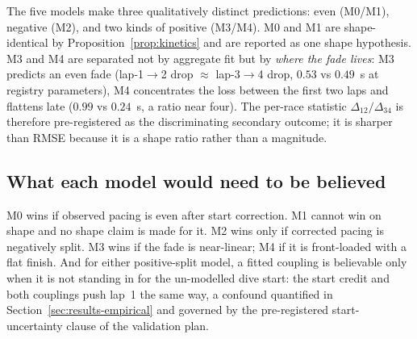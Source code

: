 The five models make three qualitatively distinct predictions: even (M0/M1),
negative (M2), and two kinds of positive (M3/M4). M0 and M1 are
shape-identical by Proposition~\ref{prop:kinetics} and are reported as one
shape hypothesis. M3 and M4 are separated not by aggregate fit but by
\emph{where the fade lives}: M3 predicts an even fade (lap-1$\to$2 drop
$\approx$ lap-3$\to$4 drop, $0.53$ vs $0.49$~s at registry parameters), M4
concentrates the loss between the first two laps and flattens late
($0.99$ vs $0.24$~s, a ratio near four). The per-race statistic
$\Delta_{12}/\Delta_{34}$ is therefore pre-registered as the discriminating
secondary outcome; it is sharper than RMSE because it is a shape ratio rather
than a magnitude.

\subsection{What each model would need to be believed}

M0 wins if observed pacing is even after start correction. M1 cannot win on
shape and no shape claim is made for it. M2 wins only if corrected pacing is
negatively split. M3 wins if the fade is near-linear; M4 if it is
front-loaded with a flat finish. And for either positive-split model, a
fitted coupling is believable only when it is not standing in for the
un-modelled dive start: the start credit and both couplings push lap~1 the
same way, a confound quantified in Section~\ref{sec:results-empirical} and
governed by the pre-registered start-uncertainty clause of the validation
plan.
